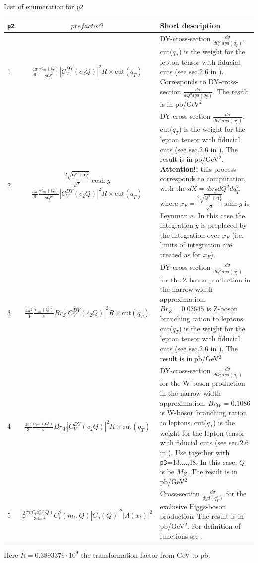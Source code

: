 \documentclass[prd,nofootinbib,eqsecnum,final]{revtex4}
\renewcommand{\(}{\left(}
\renewcommand{\)}{\right)}
\renewcommand{\[}{\left[}
\renewcommand{\]}{\right]}
\renewcommand{\vec}[1]{\bm{#1}}
\begin{document}
\begin{center}
List of enumeration for \texttt{p2}
\\
\begin{tabular}{||l|c||p{12cm}||}
\hline\hline
\texttt{p2} & ~~$prefactor2$~~&  Short description 
\\\hline
1 & $\frac{4\pi}{9}\frac{\alpha_{\text{em}}^2(Q)}{sQ^2}|C_V^{DY}(c_2Q)|^2 R \times \text{cut}(q_T)$ & DY-cross-section $\frac{d\sigma}{dQ^2 dy d(q_T^2)}$. cut($q_T$) is the weight for the lepton tensor with fiducial cuts (see sec.2.6 in \cite{Scimemi:2017etj}). Corresponds to DY-cross-section $\frac{d\sigma}{dQ^2 dy d(q_T^2)}$.  The result is in pb/GeV$^2$
\\\hline
2 & $\frac{2\sqrt{Q^2+\vec q_T^2}}{\sqrt{s}}\cosh y$ $\frac{4\pi}{9}\frac{\alpha_{\text{em}}^2(Q)}{sQ^2}|C_V^{DY}(c_2Q)|^2 R \times \text{cut}(q_T)$ & DY-cross-section $\frac{d\sigma}{dQ^2 dy d(q_T^2)}$. cut($q_T$) is the weight for the lepton tensor with fiducial cuts (see sec.2.6 in \cite{Scimemi:2017etj}).  The result is in pb/GeV$^2$. \textbf{Attention!:} this process corresponds to computation with the $dX=dx_F dQ^2 dq_T^2$ where $x_F=\frac{2\sqrt{Q^2+\vec q_T^2}}{\sqrt{s}}\sinh y$ is Feynman $x$. In this case the integration $y$ is preplaced by the integration over $x_F$ (i.e. limits of integration are treated as for $x_F$).
\\\hline
3 & $\frac{4\pi^2}{3}\frac{\alpha_{\text{em}}(Q)}{s}Br_Z|C_V^{DY}(c_2Q)|^2 R \times \text{cut}(q_T)$ & DY-cross-section $\frac{d\sigma}{dQ^2 dy d(q_T^2)}$ for the Z-boson production in the narrow width approximation. $Br_Z=0.03645$ is Z-boson branching ration to leptons. cut($q_T$) is the weight for the lepton tensor with fiducial cuts (see sec.2.6 in \cite{Scimemi:2017etj}). The result is in pb/GeV$^2$
\\\hline
4 & $\frac{4\pi^2}{3}\frac{\alpha_{\text{em}}(Q)}{s}Br_W|C_V^{DY}(c_2Q)|^2 R \times \text{cut}(q_T)$ & DY-cross-section $\frac{d\sigma}{dQ^2 dy d(q_T^2)}$ for the W-boson production in the narrow width approximation. $Br_W=0.1086$ is W-boson branching ration to leptons. cut($q_T$) is the weight for the lepton tensor with fiducial cuts (see sec.2.6 in \cite{Scimemi:2017etj}). Use together with \texttt{p3}=13,...,18. In this case, $Q$ is be $M_Z$. The result is in pb/GeV$^2$
\\\hline
5 & $\frac{2}{\pi}\frac{\pi m_H^2 a_s^2(Q)}{36 s v^2}C_t^2(m_t,Q)|C_g(Q)|^2|A(x_t)|^2$ & Cross-section $\frac{d\sigma}{dy d(q_T^2)}$ for the exclusive Higgs-boson production. The result is in pb/GeV$^2$. For definition of functions see \cite{Ahrens:2009cxz}.
\\\hline\hline
\end{tabular}
Here $R=0.3893379\cdot 10^9$ the transformation factor from GeV to pb.
\end{center}
\end{document}

